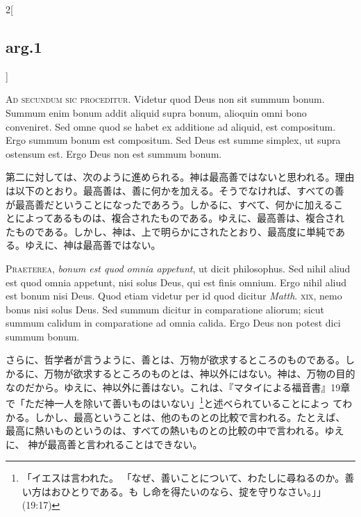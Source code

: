 \documentclass[paper=a4paper,fontsize=10pt,jafontsize=9pt,titlepage]{jlreq}
\begin{document}
\begin{paracol}{2}[\subsection{arg.1}]

{\huge A}{\scshape d secundum sic proceditur}. Videtur quod Deus non sit summum
 bonum. Summum enim bonum addit aliquid supra bonum, alioquin omni bono
 conveniret. Sed omne quod se habet ex additione ad aliquid, est
 compositum. Ergo summum bonum est compositum. Sed Deus est summe
 simplex, ut supra ostensum est. Ergo Deus non est summum bonum.

\switchcolumn

第二に対しては、次のように進められる。神は最高善ではないと思われる。理由
 は以下のとおり。最高善は、善に何かを加える。そうでなければ、すべての善
 が最高善だということになったであろう。しかるに、すべて、何かに加えるこ
 とによってあるものは、複合されたものである。ゆえに、最高善は、複合され
 たものである。しかし、神は、上で明らかにされたとおり、最高度に単純であ
 る。ゆえに、神は最高善ではない。


{\scshape Praeterea}, {\itshape bonum est quod omnia appetunt}, ut dicit
 philosophus. Sed nihil aliud est quod omnia appetunt, nisi solus Deus,
 qui est finis omnium. Ergo nihil aliud est bonum nisi Deus. Quod etiam
 videtur per id quod dicitur {\itshape Matth}. {\scshape xix}, nemo
 bonus nisi solus Deus. Sed summum dicitur in comparatione aliorum;
 sicut summum calidum in comparatione ad omnia calida. Ergo Deus non
 potest dici summum bonum.

\switchcolumn

さらに、哲学者が言うように、善とは、万物が欲求するところのものである。し
 かるに、万物が欲求するところのものとは、神以外にはない。神は、万物の目的
 なのだから。ゆえに、神以外に善はない。これは、『マタイによる福音書』19章
 で「ただ神一人を除いて善いものはいない」\footnote{「イエスは言われた。
 「なぜ、善いことについて、わたしに尋ねるのか。善い方はおひとりである。も
 し命を得たいのなら、掟を守りなさい。」」(19:17)}と述べられていることによっ
 てわかる。しかし、最高ということは、他のものとの比較で言われる。たとえば、
 最高に熱いものというのは、すべての熱いものとの比較の中で言われる。ゆえに、
 神が最高善と言われることはできない。


\end{paracol}
\end{document}
